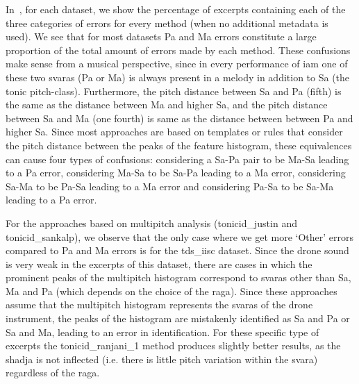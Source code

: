 {In~, for each dataset, we show the percentage of excerpts containing each of the three categories of errors for every method (when no additional metadata is used). We see that for most datasets Pa and Ma errors constitute a large proportion of the total amount of errors made by each method. These confusions make sense from a musical perspective, since in every performance of \gls{iam} one of these two \glspl{svara} (Pa or Ma) is always present in a melody in addition to Sa (the tonic pitch-class). Furthermore, the pitch distance between Sa and Pa (fifth) is
the same as the distance between Ma and higher Sa, and the pitch distance between Sa and Ma (one fourth) is same as the distance between between Pa and higher Sa. Since most approaches are based on templates or rules that consider the pitch distance between the peaks of the feature histogram, these equivalences can
cause four types of confusions: considering a Sa-Pa pair to be Ma-Sa leading to a Pa error, considering Ma-Sa to be Sa-Pa leading to a Ma error, considering
Sa-Ma to be Pa-Sa leading to a Ma error and considering Pa-Sa to be Sa-Ma leading to a Pa error.

For the approaches based on multipitch analysis (\acrshort{tonicid_justin} and \acrshort{tonicid_sankalp}), we observe that the only case where we get more `Other' errors compared to Pa and Ma errors is for the \acrshort{tds_iisc} dataset. Since the drone sound is very weak in the excerpts of this dataset, there are cases in which the prominent peaks of the multipitch histogram correspond to \glspl{svara} other than Sa, Ma and Pa (which depends on the choice of the \gls{raga}). Since these approaches assume that the multipitch histogram represents the \glspl{svara} of the drone instrument, the peaks of the histogram are mistakenly identified as Sa and Pa or Sa and Ma, leading to an error in identification. For these specific type of excerpts the \acrshort{tonicid_ranjani_1} method produces slightly better results, as the \gls{shadja} is not inflected (i.e. there is little pitch variation within the \gls{svara}) regardless of the \gls{raga}.

}
